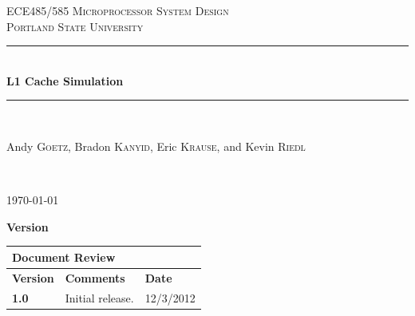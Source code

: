 \documentclass{article}
\newcommand{\HRule}{\rule{\linewidth}{0.5mm}}
\begin{document}
\newenvironment{frcseries}{\fontfamily{frc}\selectfont}{}
\newcommand{\textfrc}[1]{{\frcseries#1}}
\newcommand{\mathfrc}[1]{\text{\textfrc{#1}}}

\setcounter{tocdepth}{2}

\begin{titlepage}
 
\begin{center}
 
 
\textsc{\LARGE ECE485/585 Microprocessor System Design}\\[1.5cm]
 
\textsc{\Large Portland State University}\\[0.5cm]
 
 
\HRule \\[0.4cm]
{ \huge \bfseries L1 Cache Simulation}\\[0.4cm]
 
\HRule \\[1.5cm]
 
\begin{minipage}{0.4\textwidth}
\begin{center} \large
Andy \textsc{Goetz}, Bradon \textsc{Kanyid}, Eric \textsc{Krause}, and Kevin \textsc{Riedl}\\
\end{center}
\end{minipage}

 

 
 
\end{center}
\vfill
{ \textit{} }\\[4.0cm]
\begin{center}
{\large \today}

\end{center} 
\end{titlepage}

\newpage

\textbf{\large Version}
\vspace{.1in}

\begin{tabular}{|p{1in}|p{4in}|p{1in}|}
\hline
\multicolumn{3}{|l|}{\textbf{Document Review}} \\ 
\hline
\textbf{Version}& \textbf{Comments} & \textbf{Date} \\ 
\hline
\textbf{1.0} & Initial release. & 12/3/2012 \\
\hline
\end{tabular}
\end{document}
